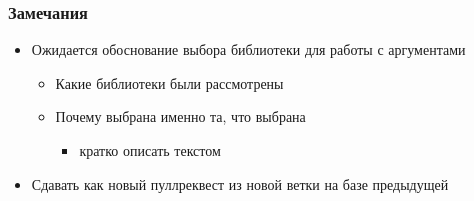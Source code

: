 \documentclass[xetex,mathserif,serif]{beamer}
\begin{document}
	\begin{frame}
		\frametitle{Замечания}
		\begin{itemize}
			\item Ожидается обоснование выбора библиотеки для работы с аргументами
			\begin{itemize}
				\item Какие библиотеки были рассмотрены
				\item Почему выбрана именно та, что выбрана
				\begin{itemize}
					\item кратко описать текстом
				\end{itemize}
			\end{itemize}
			\item Сдавать как новый пуллреквест из новой ветки на базе предыдущей
		\end{itemize}
	\end{frame}
\end{document}
